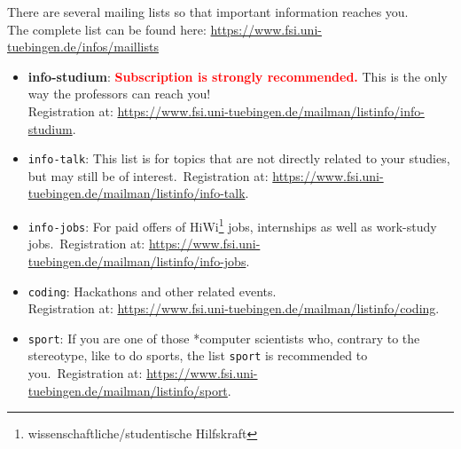 There are several mailing lists so that important information reaches you.\\
The complete list can be found here: \url{https://www.fsi.uni-tuebingen.de/infos/maillists}
\begin{itemize}
	\item \textbf{info-studium}: \textcolor{red}{\textbf{Subscription is strongly recommended.}} This is the only way the professors can reach you! \\
	Registration at: \url{https://www.fsi.uni-tuebingen.de/mailman/listinfo/info-studium}.
	\item \texttt{info-talk}: This list is for topics that are not directly related to your studies, but may still be of interest.\
	Registration at: \url{https://www.fsi.uni-tuebingen.de/mailman/listinfo/info-talk}.
	\item \texttt{info-jobs}: For paid offers of HiWi\footnote{wissenschaftliche/studentische Hilfskraft} jobs, internships as well as work-study jobs.\
	Registration at: \url{https://www.fsi.uni-tuebingen.de/mailman/listinfo/info-jobs}.
	\item \texttt{coding}: Hackathons and other related events.\\
	Registration at: \url{https://www.fsi.uni-tuebingen.de/mailman/listinfo/coding}.
	\item \texttt{sport}: If you are one of those *computer scientists who, contrary to the stereotype, like to do sports, the list \texttt{sport} is recommended to you.\
	Registration at: \url{https://www.fsi.uni-tuebingen.de/mailman/listinfo/sport}. 
\end{itemize}
